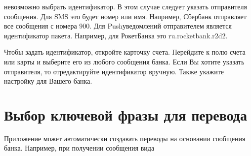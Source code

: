 \documentclass[a4paper,10pt,russian]{sphinxmanual}
\begin{document}
\begin{sphinxVerbatim}[commandchars=\\\{\}]
    
\end{sphinxVerbatim}

\sphinxAtStartPar
невозможно выбрать идентификатор. В этом случае следует указать отправителя сообщения. Для SMS это будет номер или
имя. Например, Сбербанк отправляет все сообщения с номера 900. Для Push\sphinxhyphen{}уведомлений отправителем является идентификатор пакета.
Например, для РокетБанка это ru.rocketbank.r2d2.

\sphinxAtStartPar
Чтобы задать идентификатор, откройте карточку счета. Перейдите к полю  счета или карты и выберите его из любого
сообщения банка. Если Вы хотите указать отправителя, то отредактируйте идентификатор вручную.
Также укажите настройку для Вашего банка.

\noindent{}
\noindent{}
\noindent{}
\noindent{}
\noindent{}
\noindent{}


\section{Выбор ключевой фразы для перевода}
\label{\detokenize{account-identities:id2}}
\sphinxAtStartPar
Приложение может автоматически создавать переводы на основании сообщения банка. Например, при получении сообщения вида

\begin{sphinxVerbatim}[commandchars=\\\{\}]
          
\end{sphinxVerbatim}
\end{document}
